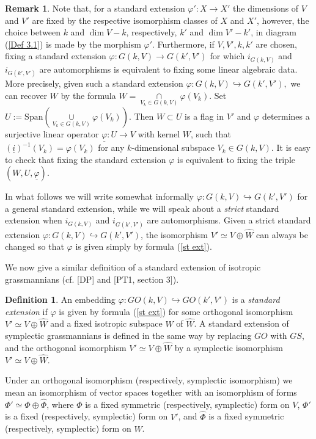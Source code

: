 \documentclass[12pt]{amsart}
\newcommand\Span{\text{Span}}
\renewcommand{\phi}{\varphi}
\theoremstyle{definition}
\newtheorem{definition}[theorem]{Definition}
\newtheorem{remark}[theorem]{Remark}
\begin{document}
\begin{remark}\label{intrinsic def}
Note that, for a standard extension $\phi':X\to X'$ the dimensions of $V$ and $V'$ are fixed by the respective
isomorphism classes of $X$ and $X'$, however, the choice between $k$ and $\dim V-k$, respectively, $k'$ and
$\dim V'-k'$, in diagram (\ref{Def 3.1}) is made by the morphism $\phi'$.
Furthermore, if $V,V',k,k'$ are chosen, fixing a standard extension $\phi:G(k,V)\to G(k',V')$
for which $i_{G(k,V)}$ and $i_{G(k',V')}$ are automorphisms is equivalent to fixing some linear algebraic data.
More precisely, given such a standard extension $\phi:G(k,V)\hookrightarrow G(k',V'),$ we can recover $W$ by the formula
$W=\underset{V_k\in G(k,V)}\cap \phi(V_k)$. Set $U:=\Span(\underset{V_k\in G(k,V)}\cup \phi(V_k))$.
Then $W\subset U$ is a flag in $V'$ and $\phi$ determines a surjective linear operator
$\underline{\phi}:U\to V$ with kernel $W$, such that $(\underline{i})^{-1}(V_k)=\phi(V_k)$
for any $k$-dimensional subspace $V_k\in G(k,V)$. It is easy to check that fixing the standard extension $\phi$ is
equivalent to fixing the triple $(W,U,\underline{\phi})$.

In what follows we will write somewhat informally $\phi:G(k,V)\hookrightarrow G(k',V')$ for a general standard
extension, while we will speak about a \textit{strict} standard extension when $i_{G(k,V)}$ and $i_{G(k',V')}$ are
automorphisms. Given a strict standard extension $\phi:G(k,V)\hookrightarrow G(k',V')$, the isomorphism
$V'\simeq V\oplus\hat{W}$ can always be changed so that $\phi$ is given simply by formula (\ref{st ext}).

\end{remark}

We now give a similar definition of a standard extension of isotropic grassmannians (cf. [DP] and [PT1, section 3]).
\begin{definition}\label{lin mor isotr}
An embedding $\phi:GO(k,V)\hookrightarrow GO(k',V')$ is a \textit{standard extension} if
$\phi$ is given by formula (\ref{st ext}) for some orthogonal isomorphism
$V'\simeq V\oplus\hat{W}$ and a fixed isotropic subspace $W$ of $\hat{W}$.
A standard extension of symplectic grassmannians is defined in the same way by replacing $GO$ with $GS$,
and the orthogonal isomorphism $V'\simeq V\oplus\hat{W}$ by a symplectic isomorphism $V'\simeq V\oplus\hat{W}$.
\end{definition}

Under an orthogonal isomorphism (respectively, symplectic isomorphism) we mean an isomorphism of vector spaces together
with an isomorphism of forms $\Phi'\simeq\Phi\oplus\hat{\Phi}$, where $\Phi$ is a fixed symmetric (respectively,
symplectic) form on $V$, $\Phi'$ is a fixed (respectively, symplectic) form on $V'$, and $\hat{\Phi}$ is a fixed
symmetric (respectively, symplectic) form on $\hat{W}$.
\end{document}
